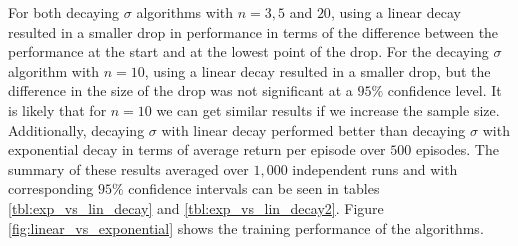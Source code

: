 For both decaying $\sigma$ algorithms with $n = 3, 5$ and $20$, using a linear decay resulted in a smaller drop in performance in terms of the difference between the performance at the start and at the lowest point of the drop.
For the decaying $\sigma$ algorithm with $n = 10$, using a linear decay resulted in a smaller drop, but the difference in the size of the drop was not significant at a $95\%$ confidence level.
It is likely that for $n = 10$ we can get similar results if we increase the sample size.
Additionally, decaying $\sigma$ with linear decay performed better than decaying $\sigma$ with exponential decay in terms of average return per episode over $500$ episodes.
The summary of these results averaged over $1,000$  independent runs and with corresponding $95\%$ confidence intervals can be seen in tables \ref{tbl:exp_vs_lin_decay} and \ref{tbl:exp_vs_lin_decay2}.
Figure \ref{fig:linear_vs_exponential} shows the training performance of the algorithms.


